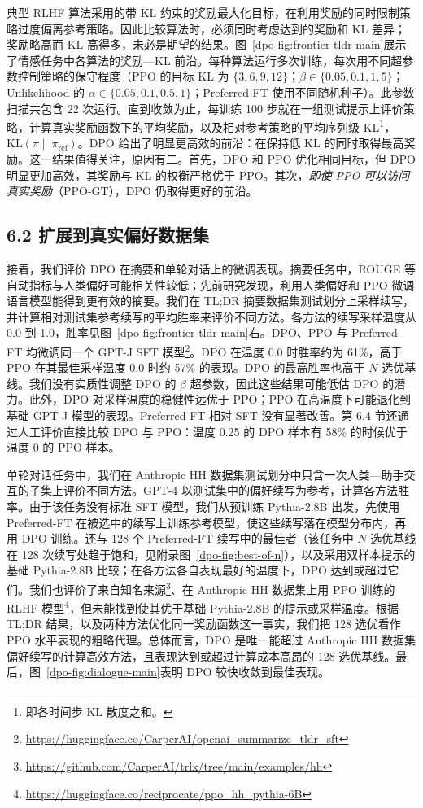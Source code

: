 典型 RLHF 算法采用的带 KL 约束的奖励最大化目标，在利用奖励的同时限制策略过度偏离参考策略。因此比较算法时，必须同时考虑达到的奖励和 KL 差异；奖励略高而 KL 高得多，未必是期望的结果。图~\ref{dpo-fig:frontier-tldr-main}展示了情感任务中各算法的奖励—KL 前沿。每种算法运行多次训练，每次用不同超参数控制策略的保守程度（PPO 的目标 KL 为 $\{3,6,9,12\}$；$\beta\in\{0.05,0.1,1,5\}$；Unlikelihood 的 $\alpha\in\{0.05,0.1,0.5,1\}$；Preferred-FT 使用不同随机种子）。此参数扫描共包含 22 次运行。直到收敛为止，每训练 100 步就在一组测试提示上评价策略，计算真实奖励函数下的平均奖励，以及相对参考策略的平均序列级 KL\footnote{即各时间步 KL 散度之和。}，$\text{KL}(\pi\mid\mid\pi_{\mathrm{ref}})$。DPO 给出了明显更高效的前沿：在保持低 KL 的同时取得最高奖励。这一结果值得关注，原因有二。首先，DPO 和 PPO 优化相同目标，但 DPO 明显更加高效，其奖励与 KL 的权衡严格优于 PPO。其次，\emph{即使 PPO 可以访问真实奖励}（PPO-GT），DPO 仍取得更好的前沿。


\subsection*{6.2 扩展到真实偏好数据集}
接着，我们评价 DPO 在摘要和单轮对话上的微调表现。摘要任务中，ROUGE 等自动指标与人类偏好可能相关性较低\cite{dpo-stiennon2022learning}；先前研究发现，利用人类偏好和 PPO 微调语言模型能得到更有效的摘要。我们在 TL;DR 摘要数据集测试划分上采样续写，并计算相对测试集参考续写的平均胜率来评价不同方法。各方法的续写采样温度从 0.0 到 1.0，胜率见图~\ref{dpo-fig:frontier-tldr-main}右。DPO、PPO 与 Preferred-FT 均微调同一个 GPT-J SFT 模型\footnote{\url{https://huggingface.co/CarperAI/openai_summarize_tldr_sft}}。DPO 在温度 0.0 时胜率约为 61\%，高于 PPO 在其最佳采样温度 0.0 时约 57\% 的表现。DPO 的最高胜率也高于 $N$ 选优基线。我们没有实质性调整 DPO 的 $\beta$ 超参数，因此这些结果可能低估 DPO 的潜力。此外，DPO 对采样温度的稳健性远优于 PPO；PPO 在高温度下可能退化到基础 GPT-J 模型的表现。Preferred-FT 相对 SFT 没有显著改善。第 6.4 节还通过人工评价直接比较 DPO 与 PPO：温度 0.25 的 DPO 样本有 58\% 的时候优于温度 0 的 PPO 样本。

单轮对话任务中，我们在 Anthropic HH 数据集\cite{dpo-bai2022training}测试划分中只含一次人类—助手交互的子集上评价不同方法。GPT-4 以测试集中的偏好续写为参考，计算各方法胜率。由于该任务没有标准 SFT 模型，我们从预训练 Pythia-2.8B 出发，先使用 Preferred-FT 在被选中的续写上训练参考模型，使这些续写落在模型分布内，再用 DPO 训练。还与 128 个 Preferred-FT 续写中的最佳者（该任务中 $N$ 选优基线在 128 次续写处趋于饱和，见附录图~\ref{dpo-fig:best-of-n}），以及采用双样本提示的基础 Pythia-2.8B 比较；在各方法各自表现最好的温度下，DPO 达到或超过它们。我们也评价了来自知名来源\footnote{\url{https://github.com/CarperAI/trlx/tree/main/examples/hh}}、在 Anthropic HH 数据集上用 PPO 训练的 RLHF 模型\footnote{\url{https://huggingface.co/reciprocate/ppo_hh_pythia-6B}}，但未能找到使其优于基础 Pythia-2.8B 的提示或采样温度。根据 TL;DR 结果，以及两种方法优化同一奖励函数这一事实，我们把 128 选优看作 PPO 水平表现的粗略代理。总体而言，DPO 是唯一能超过 Anthropic HH 数据集偏好续写的计算高效方法，且表现达到或超过计算成本高昂的 128 选优基线。最后，图~\ref{dpo-fig:dialogue-main}表明 DPO 较快收敛到最佳表现。

